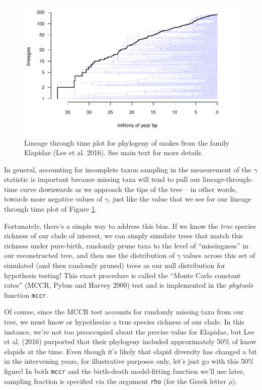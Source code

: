 \documentclass[fleqn,10pt,lineno]{wlpeerj} %
\begin{document}
\begin{figure}
\includegraphics[width=1\linewidth]{Revell.phytools-v2_peerj_files/figure-latex/fig16-elap-ltt-1} \caption{Lineage through time plot for phylogeny of snakes from the family Elapidae (Lee et al. 2016). See main text for more details.}\label{fig:fig16-elap-ltt}
\end{figure}

In general, accounting for incomplete taxon sampling in the measurement of the \(\gamma\) statistic is important because missing taxa will tend to pull our lineage-through-time curve downwards as we approach the tips of the tree -- in other words, towards more negative values of \(\gamma\), just like the value that we see for our lineage through time plot of Figure \ref{fig:fig16-elap-ltt}.

Fortunately, there's a simple way to address this bias. If we know the \emph{true} species richness of our clade of interest, we can simply simulate trees that match this richness under pure-birth, randomly prune taxa to the level of ``missingness'' in our reconstructed tree, and then use the distribution of \(\gamma\) values across this set of simulated (and then randomly pruned) trees as our null distribution for hypothesis testing! This exact procedure is called the ``Monte Carlo constant rates'' (MCCR, Pybus and Harvey 2000) test and is implemented in the \emph{phytools} function \texttt{mccr}.

Of course, since the MCCR test accounts for randomly missing taxa from our tree, we must know or hypothesize a true species richness of our clade. In this instance, we're not too preoccupied about the precise value for Elapidae, but Lee et al. (2016) purported that their phylogeny included approximately 50\% of know elapids at the time. Even though it's likely that elapid diversity has changed a bit in the intervening years, for illustrative purposes only, let's just go with this 50\% figure! In both \texttt{mccr} and the birth-death model-fitting function we'll use later, sampling fraction is specified via the argument \texttt{rho} (for the Greek letter \(\rho\)).
\end{document}
